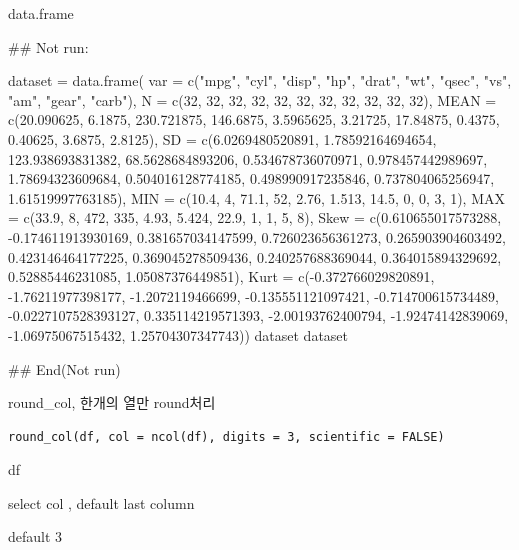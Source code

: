 \documentclass[a4paper]{book}
\begin{document}
%
\begin{Value}
data.frame
\end{Value}
%
\begin{Examples}
\begin{ExampleCode}

## Not run: 

dataset = data.frame(
var = c("mpg", "cyl", "disp", "hp",
"drat", "wt", "qsec", "vs", "am",
"gear", "carb"),
N = c(32, 32, 32, 32, 32, 32, 32,
 32, 32, 32, 32),
MEAN = c(20.090625, 6.1875, 230.721875,
 146.6875, 3.5965625, 3.21725, 17.84875,
 0.4375, 0.40625, 3.6875, 2.8125),
SD = c(6.0269480520891, 1.78592164694654,
 123.938693831382, 68.5628684893206,
  0.534678736070971, 0.978457442989697,
  1.78694323609684, 0.504016128774185,
   0.498990917235846, 0.737804065256947,
    1.61519997763185),
MIN = c(10.4, 4, 71.1, 52, 2.76,
1.513, 14.5, 0, 0, 3, 1),
MAX = c(33.9, 8, 472, 335, 4.93,
5.424, 22.9, 1, 1, 5, 8),
Skew = c(0.610655017573288, -0.174611913930169,
 0.381657034147599, 0.726023656361273,
 0.265903904603492, 0.423146464177225,
 0.369045278509436, 0.240257688369044,
  0.364015894329692, 0.52885446231085, 1.05087376449851),
Kurt = c(-0.372766029820891, -1.76211977398177,
 -1.2072119466699, -0.135551121097421,
 -0.714700615734489, -0.0227107528393127,
 0.335114219571393, -2.00193762400794,
 -1.92474142839069, -1.06975067515432,
  1.25704307347743))
dataset
dataset%



## End(Not run)


\end{ExampleCode}
\end{Examples}
%
\begin{Description}
round\_col, 한개의 열만 round처리
\end{Description}
%
\begin{Usage}
\begin{verbatim}
round_col(df, col = ncol(df), digits = 3, scientific = FALSE)
\end{verbatim}
\end{Usage}
%
\begin{Arguments}
\begin{ldescription}
\item[\code{df}] df

\item[\code{col}] select col , default last column

\item[\code{digits}] default 3
\end{ldescription}
\end{Arguments}
\end{document}
